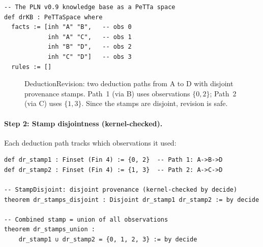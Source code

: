 \documentclass[11pt,openany]{report}
\begin{document}
\begin{lstlisting}
-- The PLN v0.9 knowledge base as a PeTTa space
def drKB : PeTTaSpace where
  facts := [inh "A" "B",   -- obs 0
            inh "A" "C",   -- obs 1
            inh "B" "D",   -- obs 2
            inh "C" "D"]   -- obs 3
  rules := []
\end{lstlisting}

\begin{figure}[htbp]
\centering
{}
\caption{DeductionRevision: two deduction paths from A to D with
disjoint provenance stamps.  Path~1 (via B) uses observations
$\{0, 2\}$; Path~2 (via C) uses $\{1, 3\}$.  Since the stamps are
disjoint, revision is safe.}
\label{fig:deduction-revision-stamps}
\end{figure}

\paragraph{Step 2: Stamp disjointness (kernel-checked).}
Each deduction path tracks which observations it used:

\begin{lstlisting}
def dr_stamp1 : Finset (Fin 4) := {0, 2}  -- Path 1: A->B->D
def dr_stamp2 : Finset (Fin 4) := {1, 3}  -- Path 2: A->C->D

-- StampDisjoint: disjoint provenance (kernel-checked by decide)
theorem dr_stamps_disjoint : Disjoint dr_stamp1 dr_stamp2 := by decide

-- Combined stamp = union of all observations
theorem dr_stamps_union :
    dr_stamp1 ∪ dr_stamp2 = {0, 1, 2, 3} := by decide
\end{lstlisting}
\end{document}
